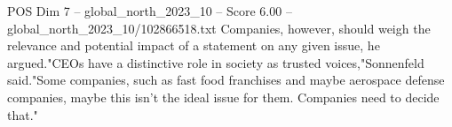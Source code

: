 \begin{textsample}{POS Dim 7 – global\_north\_2023\_10 – Score 6.00 – global\_north\_2023\_10/102866518.txt}
Companies, however, should weigh the relevance and potential impact of a statement on any given issue, he argued."CEOs have a distinctive role in society as trusted voices,"Sonnenfeld said."Some companies, such as fast food franchises and maybe aerospace defense companies, maybe this isn't the ideal issue for them.
Companies need to decide that."

\end{textsample}
